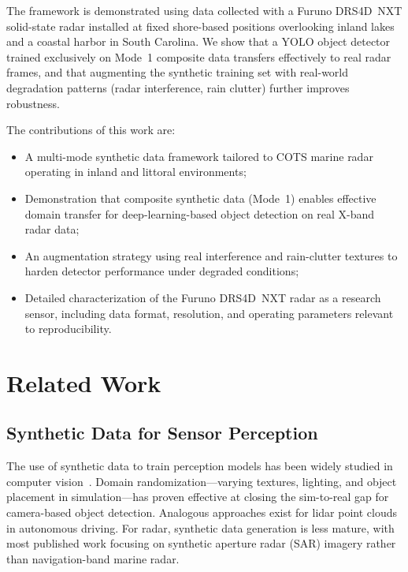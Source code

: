 \documentclass[twocolumn, 10pt]{article}
\begin{document}
The framework is demonstrated using data collected with a Furuno DRS4D~NXT solid-state radar installed at fixed shore-based positions overlooking inland lakes and a coastal harbor in South Carolina. We show that a YOLO object detector trained exclusively on Mode~1 composite data transfers effectively to real radar frames, and that augmenting the synthetic training set with real-world degradation patterns (radar interference, rain clutter) further improves robustness.

The contributions of this work are:
\begin{itemize}
    \item A multi-mode synthetic data framework tailored to COTS marine radar operating in inland and littoral environments;
    \item Demonstration that composite synthetic data (Mode~1) enables effective domain transfer for deep-learning-based object detection on real X-band radar data;
    \item An augmentation strategy using real interference and rain-clutter textures to harden detector performance under degraded conditions;
    \item Detailed characterization of the Furuno DRS4D~NXT radar as a research sensor, including data format, resolution, and operating parameters relevant to reproducibility.
\end{itemize}

\section{Related Work}
\label{sec:related}

\subsection{Synthetic Data for Sensor Perception}

The use of synthetic data to train perception models has been widely studied in computer vision~\cite{tobin2017domain, tremblay2018training, nikolenko2021synthetic}. Domain randomization---varying textures, lighting, and object placement in simulation---has proven effective at closing the sim-to-real gap for camera-based object detection. Analogous approaches exist for lidar point clouds in autonomous driving. For radar, synthetic data generation is less mature, with most published work focusing on synthetic aperture radar (SAR) imagery rather than navigation-band marine radar.
\end{document}
